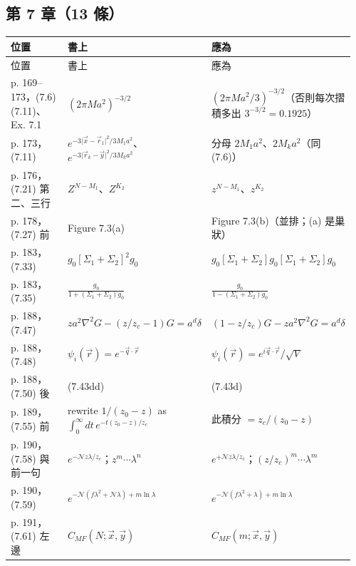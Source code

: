\subsection{第 7 章（13 條）}
{\footnotesize\renewcommand{\arraystretch}{1.1}\setlength{\tabcolsep}{4pt}
\begin{longtable}{@{}>{\raggedright\arraybackslash}p{0.21\linewidth}>{\raggedright\arraybackslash}p{0.34\linewidth}>{\raggedright\arraybackslash}p{0.41\linewidth}@{}}
\toprule 位置 & 書上 & 應為\\ \midrule\endfirsthead
\toprule 位置 & 書上 & 應為\\ \midrule\endhead
\bottomrule\endfoot
p. 169–173，(7.6)(7.11)、Ex. 7.1 & $(2\pi Ma^2)^{-3/2}$ & $(2\pi Ma^2/3)^{-3/2}$（否則每次摺積多出 $3^{-3/2}=0.1925$）\\
p. 173，(7.11) & $e^{-3\lvert\vec x-\vec r_1\rvert^2/3M_1a^2}$、$e^{-3\lvert\vec r_k-\vec y\rvert^2/3M_ka^2}$ & 分母 $2M_1a^2$、$2M_ka^2$（同 (7.6)）\\
p. 176，(7.21) 第二、三行 & $Z^{N-M_1}$、$Z^{K_2}$ & $z^{N-M_1}$、$z^{K_2}$\\
p. 178，(7.27) 前 & Figure 7.3(a) & Figure 7.3(b)（並排；(a) 是巢狀）\\
p. 183，(7.33) & $g_0[\Sigma_1+\Sigma_2]^2g_0$ & $g_0[\Sigma_1+\Sigma_2]g_0[\Sigma_1+\Sigma_2]g_0$\\
p. 183，(7.35) & $\frac{g_0}{1+(\Sigma_1+\Sigma_2)g_0}$ & $\frac{g_0}{1-(\Sigma_1+\Sigma_2)g_0}$\\
p. 188，(7.47) & $za^2\nabla^2G-(z/z_c-1)G=a^d\delta$ & $(1-z/z_c)G-za^2\nabla^2G=a^d\delta$\\
p. 188，(7.48) & $\psi_i(\vec r)=e^{-\vec q\cdot\vec r}$ & $\psi_i(\vec r)=e^{i\vec q\cdot\vec r}/\sqrt V$\\
p. 188，(7.50) 後 & (7.43dd) & (7.43d)\\
p. 189，(7.55) 前 & rewrite $1/(z_0-z)$ as $\int_0^\infty dt\,e^{-t(z_0-z)/z_c}$ & 此積分 $=z_c/(z_0-z)$\\
p. 190，(7.58) 與前一句 & $e^{-\mathcal Nz\lambda/z_c}$；$z^m\cdots\lambda^n$ & $e^{+\mathcal Nz\lambda/z_c}$；$(z/z_c)^m\cdots\lambda^m$\\
p. 190，(7.59) & $e^{-\mathcal N(f\lambda^2+\mathcal N\lambda)+m\ln\lambda}$ & $e^{-\mathcal N(f\lambda^2+\lambda)+m\ln\lambda}$\\
p. 191，(7.61) 左邊 & $C_{MF}(N;\vec x,\vec y)$ & $C_{MF}(m;\vec x,\vec y)$\\
\end{longtable}}


